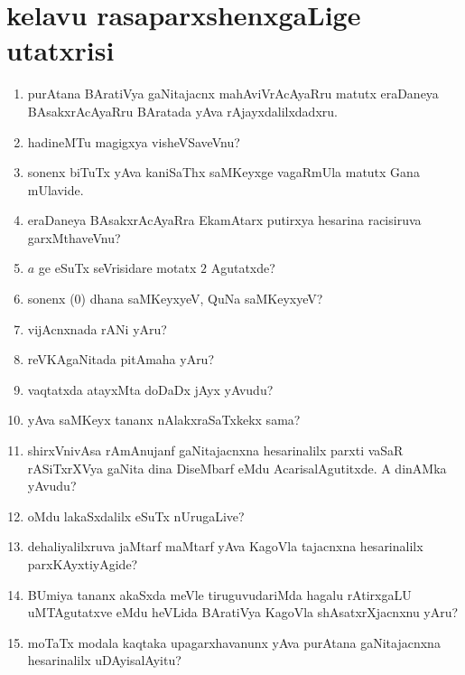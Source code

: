 \chapter{kelavu rasaparxshenxgaLige utatxrisi}\label{chap20}

\begin{enumerate}
 \renewcommand{\labelenumi}{\rm(\theenumi)}
\item purAtana BAratiVya gaNitajacnx mahAviVrAcAyaRru matutx eraDaneya BAsakxrAcAyaRru BAratada yAva rAjayxdalilxdadxru.

\item hadineMTu magigxya visheVSaveVnu?

\item sonenx biTuTx yAva kaniSaThx saMKeyxge vagaRmUla matutx Gana mUlavide.

\item eraDaneya BAsakxrAcAyaRra EkamAtarx putirxya hesarina racisiruva garxMthaveVnu?
  
\item $a$ ge eSuTx seVrisidare motatx $2$ Agutatxde?
  
\item sonenx ($0$) dhana saMKeyxyeV, QuNa saMKeyxyeV?
  
\item vijAcnxnada rANi yAru?
  
\item reVKAgaNitada pitAmaha yAru?
   
\item vaqtatxda atayxMta doDaDx jAyx yAvudu?
  
\item yAva saMKeyx tananx nAlakxraSaTxkekx sama?

\item shirxVnivAsa rAmAnujanf gaNitajacnxna hesarinalilx parxti vaSaR rASiTxrXVya gaNita dina DiseMbarf eMdu AcarisalAgutitxde. A dinAMka yAvudu?

\item oMdu lakaSxdalilx eSuTx nUrugaLive?
  
\item dehaliyalilxruva jaMtarf maMtarf yAva KagoVla tajacnxna hesarinalilx parxKAyxtiyAgide?
  
\item BUmiya tananx akaSxda meVle tiruguvudariMda hagalu rAtirxgaLU uMTAgutatxve eMdu heVLida BAratiVya KagoVla shAsatxrXjacnxnu yAru?
  
\item moTaTx modala kaqtaka upagarxhavanunx yAva purAtana gaNitajacnxna hesarinalilx uDAyisalAyitu?
  

\end{enumerate}
